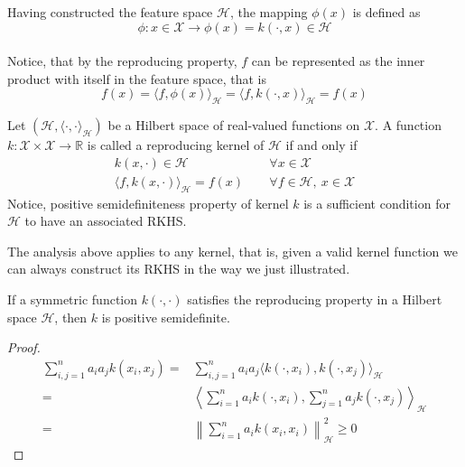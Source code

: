 Having constructed the feature space $\mathcal{H}$, the mapping $\phi(x)$ is defined as
\\
\begin{equation}
    \phi: x \in \mathcal{X} \to \phi(x)=k(\cdot, x) \in \mathcal{H}
\end{equation}
\\
Notice, that by the reproducing property, $f$ can be represented as the inner product with itself in the feature space, that is 
\begin{equation}
    f(x)=\langle f, \phi(x)\rangle_{\mathcal{H}}=\langle f, k(\cdot, x)\rangle_{\mathcal{H}}=f(x)
\end{equation}

\begin{definition}
    Let $(\mathcal{H}, \langle \cdot, \cdot \rangle_\mathcal{H})$ be a Hilbert space of real-valued functions on $\mathcal{X}$. A function $k: \mathcal{X} \times \mathcal{X} \to \mathbb{R}$ is called a reproducing kernel of $\mathcal{H}$ if and only if 
     \begin{align}
        k(x, \cdot) \in \mathcal{H} &\quad \ \forall x \in \mathcal{X}    \\
        \langle  f, k(x, \cdot) \rangle_\mathcal{H} = f(x) &\quad \ \forall f\in \mathcal{H}, \ x \in \mathcal{X}
    \end{align}
    Notice, positive semidefiniteness property of kernel $k$ is a sufficient condition for $\mathcal{H}$ to have an associated RKHS.
\end{definition}

The analysis above applies to any kernel, that is, given a valid kernel function we can always construct its RKHS in the way we just illustrated.
\begin{theorem}
    If a symmetric function $k(\cdot, \cdot)$ satisfies the reproducing property in a Hilbert space $\mathcal{H}$, then $k$ is positive semidefinite.
\end{theorem}

\begin{proof}
    \begin{align}
        \sum\limits_{i,j=1}^n a_i a_j k(x_i, x_j)=& \sum\limits_{i,j=1}^n a_i a_j \langle k(\cdot, x_i), k(\cdot, x_j)\rangle_{\mathcal{H}}
        \\
        =& \left\langle \sum\limits_{i=1}^n a_i k(\cdot, x_i), \sum\limits_{j=1}^n a_j k(\cdot, x_j) \right\rangle_{\mathcal{H}} \\
        =& \left\| \sum\limits_{i=1}^n a_i k(x_i, x_i)\right\|_{\mathcal{H}}^2 \geq 0
    \end{align}
\end{proof}
   
